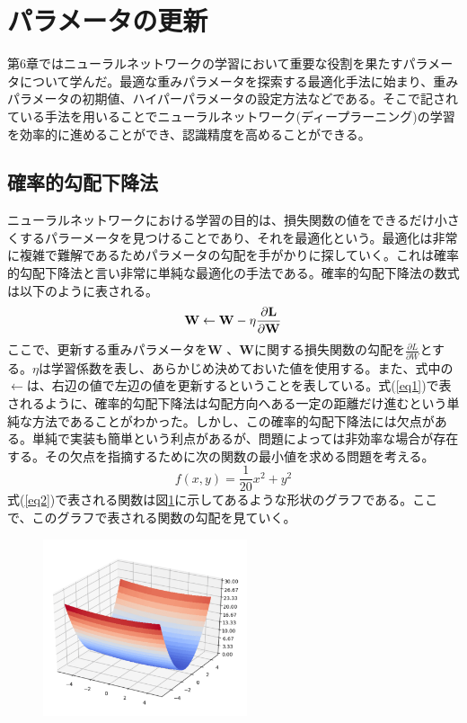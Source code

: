 \section{パラメータの更新}
{第6章ではニューラルネットワークの学習において重要な役割を果たすパラメータについて学んだ。最適な重みパラメータを探索する最適化手法に始まり、重みパラメータの初期値、ハイパーパラメータの設定方法などである。そこで記されている手法を用いることでニューラルネットワーク(ディープラーニング)の学習を効率的に進めることができ、認識精度を高めることができる。
}



\subsection{確率的勾配下降法}
{ニューラルネットワークにおける学習の目的は、損失関数の値をできるだけ小さくするパラーメータを見つけることであり、それを最適化という。最適化は非常に複雑で難解であるためパラメータの勾配を手がかりに探していく。これは確率的勾配下降法と言い非常に単純な最適化の手法である。確率的勾配下降法の数式は以下のように表される。
{
\begin{equation}
\label{eq1}
\bf W \leftarrow W - \eta  \frac{\partial L}{\partial W}
\end{equation}
}
ここで、更新する重みパラメータを{\bf W} 、{\bf W}に関する損失関数の勾配を$\displaystyle \frac{\partial L}{\partial W}$とする。$\displaystyle {\eta}$は学習係数を表し、あらかじめ決めておいた値を使用する。また、式中の$\displaystyle {\leftarrow}$は、右辺の値で左辺の値を更新するということを表している。式(\ref{eq1})で表されるように、確率的勾配下降法は勾配方向へある一定の距離だけ進むという単純な方法であることがわかった。しかし、この確率的勾配下降法には欠点がある。単純で実装も簡単という利点があるが、問題によっては非効率な場合が存在する。その欠点を指摘するために次の関数の最小値を求める問題を考える。
\begin{equation}
\label{eq2}
f(x,y) = \frac{1}{20}x^{2} + y^{2}
\end{equation}
式(\ref{eq2})で表される関数は図\ref{gr1}に示してあるような形状のグラフである。ここで、このグラフで表される関数の勾配を見ていく。
\begin{figure}[H]
\label{gr1}
\centering
\includegraphics[width=6cm]{./figure/Graph.png}

\end{figure}}
